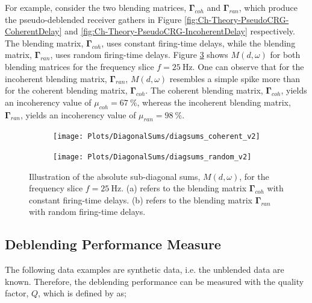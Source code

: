 For example, consider the two blending matrices, $\mathbf{\Gamma}_{coh}$ and $\mathbf{\Gamma}_{ran}$, which produce the pseudo-deblended receiver gathers in Figure \ref{fig:Ch-Theory-PseudoCRG-CoherentDelay} and \ref{fig:Ch-Theory-PseudoCRG-IncoherentDelay} respectively. The blending matrix, $\mathbf{\Gamma}_{coh}$, uses constant firing-time delays, while the blending matrix, $\mathbf{\Gamma}_{ran}$, uses random firing-time delays. Figure \ref{fig:Ch-Incoherency-Coh-vs-Ran-Diag} shows $M(d,\omega)$ for both blending matrices for the frequency slice $f=\SI{25}{\hertz}$. One can observe that for the incoherent blending matrix, $\mathbf{\Gamma}_{ran}$, $M(d,\omega)$ resembles a simple spike more than for the coherent blending matrix, $\mathbf{\Gamma}_{coh}$. The coherent blending matrix, $\mathbf{\Gamma}_{coh}$,  yields an incoherency value of $\mu_{coh} = \SI{67}{\percent}$, whereas the incoherent blending matrix, $\mathbf{\Gamma}_{ran}$, yields an incoherency value of $\mu_{ran} = \SI{98}{\percent}$.

\begin{figure}
	
	\centering
	\begin{subfigure}[b]{0.45\textwidth}
	\centering
	\texttt{[image: Plots/DiagonalSums/diagsums\_coherent\_v2]}	
	\caption{}
	\label{fig:Ch-Incoherency-CoherentDiag}	
	\end{subfigure}
	\centering
	\begin{subfigure}[b]{0.45\textwidth}
	\centering
	\texttt{[image: Plots/DiagonalSums/diagsums\_random\_v2]}	
	\caption{}
	\label{fig:Ch-Incoherency-RandomDiag}	
	\end{subfigure}
	
	\caption{Illustration of the absolute sub-diagonal sums, $M(d,\omega)$, for the frequency slice $f=\SI{25}{\hertz}$. (a) refers to the blending matrix $\mathbf{\Gamma}_{coh}$ with constant firing-time delays.  (b) refers to the blending matrix $\mathbf{\Gamma}_{ran}$ with random firing-time delays.}
	\label{fig:Ch-Incoherency-Coh-vs-Ran-Diag}
	
\end{figure}


\subsection*{Deblending Performance Measure}

The following data examples are synthetic data, i.e. the unblended data are known. Therefore, the deblending performance can be measured with the quality factor, $Q$, which is defined by \citet{IbrahimQuality} as;

